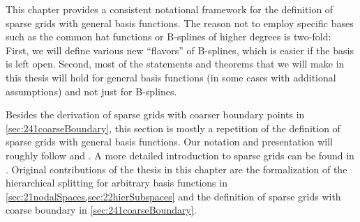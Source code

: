 This chapter provides a consistent notational framework
for the definition of sparse grids with general basis functions.
The reason not to employ specific bases such as the common hat functions
or B-splines of higher degrees is two-fold:
First, we will define various new ``flavors'' of B-splines,
which is easier if the basis is left open.
Second, most of the statements and theorems that we will make in this
thesis will hold for general basis functions
(in some cases with additional assumptions)
and not just for B-splines.

Besides the derivation of sparse grids with
coarser boundary points in \cref{sec:241coarseBoundary},
this section is mostly
a repetition of the definition of sparse grids with general basis functions.
Our notation and presentation will roughly follow
\cite{Pflueger10Spatially} and \cite{Garcke13Sparse}.
A more detailed introduction to sparse grids can be found in
\cite{Bungartz04Sparse}.
Original contributions of the thesis in this chapter
are the formalization of the hierarchical splitting for
arbitrary basis functions in \cref{sec:21nodalSpaces,sec:22hierSubspaces} and
the definition of sparse grids with coarse boundary in
\cref{sec:241coarseBoundary}.








\cleardoublepage
